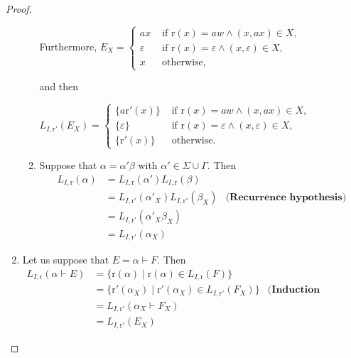 \documentclass[a4paper]{llncs}
\begin{document}
\begin{proof}
\begin{enumerate}
\begin{enumerate}
              Furthermore, 
              $E_X=
            \begin{cases}
                    ax & \text{ if } \mathrm{r}(x)=aw\wedge (x,ax)\in X,\\
                    \varepsilon & \text{ if } \mathrm{r}(x)=\varepsilon\wedge (x,\varepsilon)\in X,\\
                    x& \text{ otherwise,}
                  \end{cases}
               $
               
               and then 
               
               $L_{I,\mathrm{r}'}(E_X)=               
            \begin{cases}
                  \{a\mathrm{r}'(x)\} & \text{ if } \mathrm{r}(x)=aw\wedge (x,ax)\in X,\\
                  \{\varepsilon\} & \text{ if } \mathrm{r}(x)=\varepsilon \wedge (x,\varepsilon)\in X,\\
                  \{\mathrm{r}'(x)\} & \text{ otherwise.}
                \end{cases}$
              
          \item Suppose that $\alpha=\alpha'\beta$ with $\alpha'\in\Sigma\cup\Gamma$.
                Then        
        \begin{align*}
                    L_{I,\mathrm{r}}(\alpha) & =L_{I,\mathrm{r}}(\alpha')L_{I,\mathrm{r}}(\beta)\\
                    & =L_{I,\mathrm{r}'}(\alpha'_X) L_{I,\mathrm{r}'}(\beta_X) &\textbf{(Recurrence hypothesis)}\\
                    & =L_{I,\mathrm{r}'}(\alpha'_X\beta_X)\\
                    & =L_{I,\mathrm{r}'}(\alpha_X)       
        \end{align*}
        \end{enumerate}
        
      \item Let us suppose that $E=\alpha\vdash F$.
        Then    
        \begin{align*}
            L_{I,\mathrm{r}}(\alpha\vdash E) & =\{\mathrm{r}(\alpha)\mid \mathrm{r}(\alpha)\in L_{I,\mathrm{r}}(F)\}\\
            & =\{\mathrm{r}'(\alpha_X)\mid \mathrm{r}'(\alpha_X)\in L_{I,\mathrm{r}'}(F_X)\}&\textbf{(Induction hypothesis)}\\
            & =L_{I,\mathrm{r}'}(\alpha_X\vdash F_X)\\
            & =L_{I,\mathrm{r}'}(E_X)   
        \end{align*}
        

\end{enumerate}
\end{proof}
\end{document}
